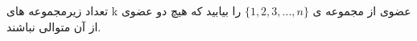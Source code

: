 
تعداد زیرمجموعه های k عضوی از مجموعه ی $\{1, 2, 3, ..., n\}$ را بیابید که هیچ دو عضوی از آن متوالی نباشند.
